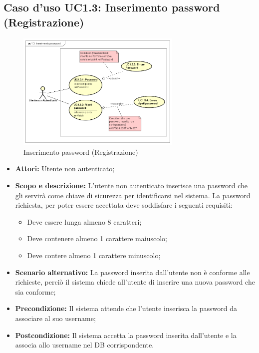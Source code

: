 \documentclass[12pt,a4paper,titlepage]{article}
\begin{document}
\subsection{Caso d'uso UC1.3: Inserimento password (Registrazione)}
\begin{figure}[H]
	\centering
	\includegraphics[width=0.7\textwidth]{UseCase/InserimentoPassword}
	\caption{Inserimento password (Registrazione)}
\end{figure}
\begin{itemize}
	\item \textbf{Attori: }Utente non autenticato;
	\item \textbf{Scopo e descrizione: } L'utente non autenticato inserisce una password che gli servirà come chiave di sicurezza per identificarsi nel sistema. La password richiesta, per poter essere accettata deve soddisfare i seguenti requisiti: 
	\begin{itemize}
		\item Deve essere lunga almeno 8 caratteri; 
		\item Deve contenere almeno 1 carattere maiuscolo; 
		\item Deve contere almeno 1 carattere minuscolo;
	\end{itemize}
	\item \textbf{Scenario alternativo: }La password inserita dall'utente non è conforme alle richieste, perciò il sistema chiede all'utente di inserire una nuova password che sia conforme;
	\item \textbf{Precondizione: }Il sistema attende che l'utente inserisca la password da associare al suo username;
	\item \textbf{Postcondizione: }Il sistema accetta la password inserita dall'utente e la associa allo username nel DB corrispondente.
\end{itemize}
\end{document}
